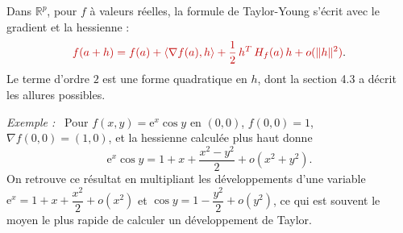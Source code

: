 \documentclass[a4paper,twoside]{report}
\newcommand{\rmath}[1]{\textcolor{rougecours}{#1}}
\newenvironment{exemple}%
 {\par\needspace{6\baselineskip}\vspace{1mm}\begin{list}{}{\leftmargin=1cm \rightmargin=0.5cm}\item[]%
  \textit{Exemple :}~}%
 {\end{list}\vspace{1mm}}
\newcommand{\R}{\mathbb{R}}
\newcommand{\ee}{\mathrm{e}}                      %
\newcommand{\tra}[1]{{#1}^{T}}                    %
\newcommand{\norme}[1]{\lVert #1 \rVert}         %
\newcommand{\ps}[2]{\langle #1, #2 \rangle}       %
\newcommand{\grad}{\nabla}                        %
\newcommand{\Hs}{H}                               %
\begin{document}
\noindent Dans $\R^{p}$, pour $f$ à valeurs réelles, la formule de Taylor-Young s'écrit avec le gradient et la hessienne :
\[ \rmath{f(a + h) = f(a) + \ps{\grad f(a)}{h} + \frac{1}{2}\,\tra{h}\,\Hs_{f}(a)\,h + o(\norme{h}^{2})}. \]
Le terme d'ordre $2$ est une forme quadratique en $h$, dont la section 4.3 a décrit les allures possibles.

\begin{exemple}
Pour $f(x, y) = \ee^{x}\cos y$ en $(0, 0)$, $f(0, 0) = 1$, $\grad f(0, 0) = (1, 0)$, et la hessienne calculée plus haut donne
\[ \ee^{x}\cos y = 1 + x + \frac{x^{2} - y^{2}}{2} + o(x^{2} + y^{2}). \]
On retrouve ce résultat en multipliant les développements d'une variable $\ee^{x} = 1 + x + \dfrac{x^{2}}{2} + o(x^{2})$ et $\cos y = 1 - \dfrac{y^{2}}{2} + o(y^{2})$, ce qui est souvent le moyen le plus rapide de calculer un développement de Taylor.
\end{exemple}
\end{document}
